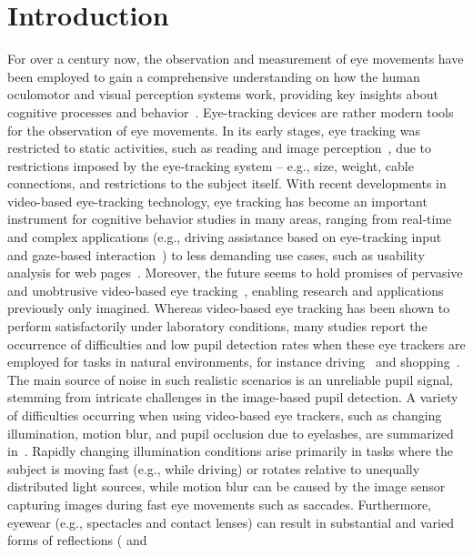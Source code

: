 \section{Introduction}
For over a century now, the observation and measurement of eye movements have
been employed to gain a comprehensive understanding on how the human oculomotor
and visual perception systems work, providing key insights about cognitive
processes and behavior~\citet{wade2005moving}. Eye-tracking devices are rather
modern tools for the observation of eye movements.
In its early stages, eye tracking was restricted to static activities, such as
reading and image perception~\citet{yarbus1957perception}, due to restrictions
imposed by the eye-tracking system -- e.g., size, weight, cable connections, and
restrictions to the subject itself.
With recent developments in video-based eye-tracking technology, eye tracking
has become an important instrument for cognitive behavior studies in many areas,
ranging from real-time and complex applications (e.g., driving
assistance based on eye-tracking input~\citet{kasneci2013towards} and gaze-based
interaction~\citet{turner2013eye}) to less demanding use cases, such as usability
analysis for web pages~\citet{cowen2002eye}.
Moreover, the future seems to hold promises of pervasive and unobtrusive
video-based eye tracking~\citet{kassner2014pupil}, enabling research and
applications previously only imagined.
Whereas video-based eye tracking has been shown to perform satisfactorily under
laboratory conditions, many studies report the occurrence of difficulties and
low pupil detection rates when these eye trackers are employed for tasks in
natural environments, for instance
driving~\citet{kasneci2013towards,liu2002real,trosterer2014eye} and
shopping~\citet{kasneci2014homonymous}.
The main source of noise in such realistic scenarios is an unreliable pupil
signal, stemming from intricate challenges in the image-based pupil
detection.
A variety of difficulties occurring when using video-based eye trackers, such as
changing illumination, motion blur, and pupil occlusion due to eyelashes, are
summarized in~\citet{schnipke2000trials}.
Rapidly changing illumination conditions arise primarily in tasks where the
subject is moving fast (e.g., while driving) or rotates relative to unequally
distributed light sources, while motion blur can be caused by the image sensor
capturing images during fast eye movements such as saccades.
Furthermore, eyewear (e.g., spectacles and contact lenses) can result in
substantial and varied forms of reflections ( and
